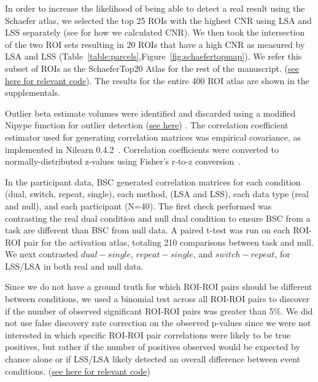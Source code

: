 \documentclass[phd,appendix,figures]{uithesis}
\begin{document}
In order to increase the likelihood of being able to detect a real result using the Schaefer atlas,
we selected the top 25 ROIs with the highest CNR using LSA and LSS separately
(see  for how we calculated CNR).
We then took the intersection of the two ROI sets resulting in 20 ROIs that have a high CNR
as measured by LSA and LSS (Table~\ref{table:parcels},Figure~\ref{fig:schaefertopmap}).
We refer this subset of ROIs as the SchaeferTop20 Atlas for the rest of the manuscript.
(\href{https://github.com/jdkent/BetaSeriesRealDataAnalysis/blob/b18b44321edf7b662a1e5ea635f64452c8d3644c/nibsAnalysis/cnr_trial_variability.ipynb}{see here for relevant code}).
The results for the entire 400 ROI atlas are shown in the supplementals.

Outlier beta estimate volumes were identified and discarded using a
modified Nipype function for outlier detection
(\href{https://github.com/HBClab/NiBetaSeries/blob/a45c0a1f/src/nibetaseries/interfaces/nilearn.py#L153}{see here}) \cite{Crosby1994}.
The correlation coefficient estimator used for generating correlation matrices
was empirical covariance, as implemented in Nilearn 0.4.2~\cite{Abraham2014}.
Correlation coefficients were converted to normally-distributed z-values using
Fisher's r-to-z conversion~\cite{Fisher1915}.

In the participant data, BSC generated correlation matrices for each condition (dual, switch, repeat, single),
each method, (LSA and LSS), each data type (real and null), and each participant (N=40).
The first check performed was contrasting the real dual condition and null dual condition
to ensure BSC from a task are different than BSC from null data.
A paired t-test was run on each ROI-ROI pair for the activation atlas, totaling 210 comparisons
between task and null.
We next contrasted $dual - single$, $repeat - single$, and $switch - repeat$, for LSS/LSA in both
real and null data.

Since we do not have a ground truth for which ROI-ROI pairs should be different between conditions,
we used a binomial test across all ROI-ROI pairs to discover if the number of observed significant ROI-ROI pairs was greater
than 5\%.
We did not use false discovery rate correction on the observed p-values since we were not interested in
which specific ROI-ROI pair correlations were likely to be true positives, but rather if the number of positives
observed would be expected by chance alone or if LSS/LSA likely detected an overall difference between event conditions.
(\href{https://github.com/jdkent/BetaSeriesRealDataAnalysis/blob/b18b44321edf7b662a1e5ea635f64452c8d3644c/nibsAnalysis/beta_series_analysis.ipynb}{see here for relevant code})
\end{document}
